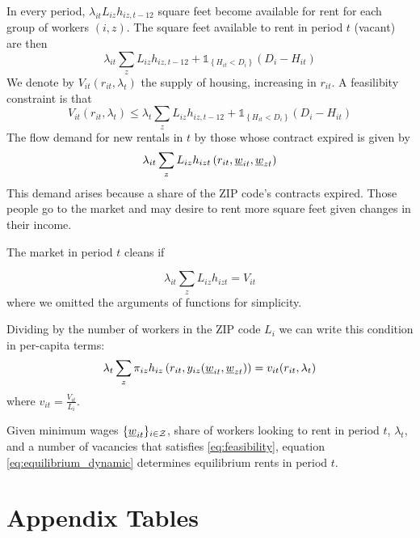In every period, $\lambda_{it} L_{iz} h_{iz,t-12}$ square feet become available for 
rent for each group of workers $(i,z)$.
The square feet available to rent in period $t$ (vacant) are then
$$
\lambda_{it} \sum_z L_{iz} h_{iz,t-12} + \mathds{1}_{\left\{H_{it} < D_i\right\}} (D_i - 
H_{it})
$$
We denote by $V_{it}(r_{it}, \lambda_t)$ the supply of housing, increasing in $r_{it}$. 
A feasilibity constraint is that 
\begin{equation}\label{eq:feasibility}
	V_{it}(r_{it}, \lambda_t) \leq \lambda_t \sum_z L_{iz} h_{iz,t-12} + 
	\mathds{1}_{\left\{H_{it} < D_i\right\}} (D_i - H_{it})
\end{equation}
The flow demand for new rentals in $t$ by those whose contract expired is given by
$$
\lambda_{it} \sum_z L_{iz} h_{izt} \left(r_{it}, \underline{w}_{it}, \underline{w}_{zt} \right)
$$
This demand arises because a share of the ZIP code's contracts expired. Those people
go to the market and may desire to rent more square feet given changes in their income.

The market in period $t$ cleans if

$$
\lambda_{it} \sum_z L_{iz} h_{izt} = V_{it}
$$
where we omitted the arguments of functions for simplicity.

Dividing by the number of workers in the ZIP code $L_i$ we can write this condition in 
per-capita terms:
\begin{equation}\label{eq:equilibrium_dynamic}
	\lambda_t \sum_z \pi_{iz} h_{iz} \left(r_{it}, y_{iz} (\underline{w}_{it}, \underline{w}_{zt}) \right) = 
	v_{it}(r_{it}, \lambda_t)
\end{equation}
where $v_{it} = \frac{V_{it}}{L_{i}}$.

Given minimum wages $\{\underline{w}_{it}\}_{i\in\mathcal{Z}}$, share of workers looking to rent in period 
$t$, $\lambda_t$, and a number of vacancies that satisfies \eqref{eq:feasibility},
equation \eqref{eq:equilibrium_dynamic} determines equilibrium rents in period $t$.

\textcite{AcemogluAutor2011lectures}

\clearpage
\section{Appendix Tables}

